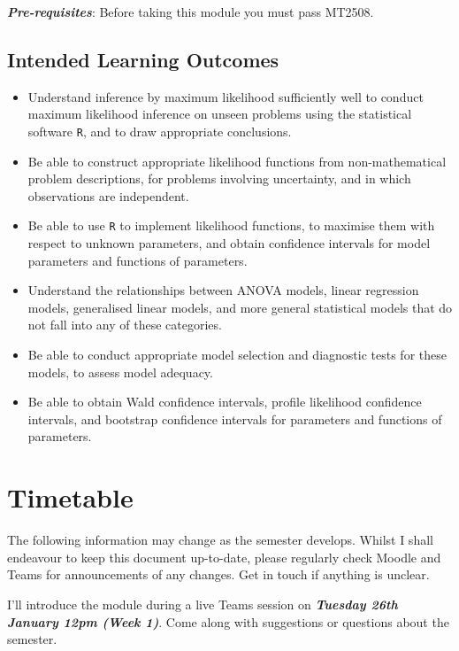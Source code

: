 \documentclass[
  openany]{book}
\begin{document}
\textbf{\emph{Pre-requisites}}: Before taking this module you must pass MT2508.

\hypertarget{intended-learning-outcomes}{%
\section*{Intended Learning Outcomes}\label{intended-learning-outcomes}}

\begin{itemize}
\item
  Understand inference by maximum likelihood sufficiently well to conduct maximum likelihood inference on unseen problems using the statistical software \texttt{R}, and to draw appropriate conclusions.
\item
  Be able to construct appropriate likelihood functions from non-mathematical problem descriptions, for problems involving uncertainty, and in which observations are independent.
\item
  Be able to use \texttt{R} to implement likelihood functions, to maximise them with respect to unknown parameters, and obtain confidence intervals for model parameters and functions of parameters.
\item
  Understand the relationships between ANOVA models, linear regression models, generalised linear models, and more general statistical models that do not fall into any of these categories.
\item
  Be able to conduct appropriate model selection and diagnostic tests for these models, to assess model adequacy.
\item
  Be able to obtain Wald confidence intervals, profile likelihood confidence intervals, and bootstrap confidence intervals for parameters and functions of parameters.
\end{itemize}

\hypertarget{timetable}{%
\chapter*{Timetable}\label{timetable}}

The following information may change as the semester develops. Whilst I shall endeavour to keep this document up-to-date, please regularly check Moodle and Teams for announcements of any changes. Get in touch if anything is unclear.

I'll introduce the module during a live Teams session on \textbf{\emph{Tuesday 26th January 12pm (Week 1)}}. Come along with suggestions or questions about the semester.
\end{document}
